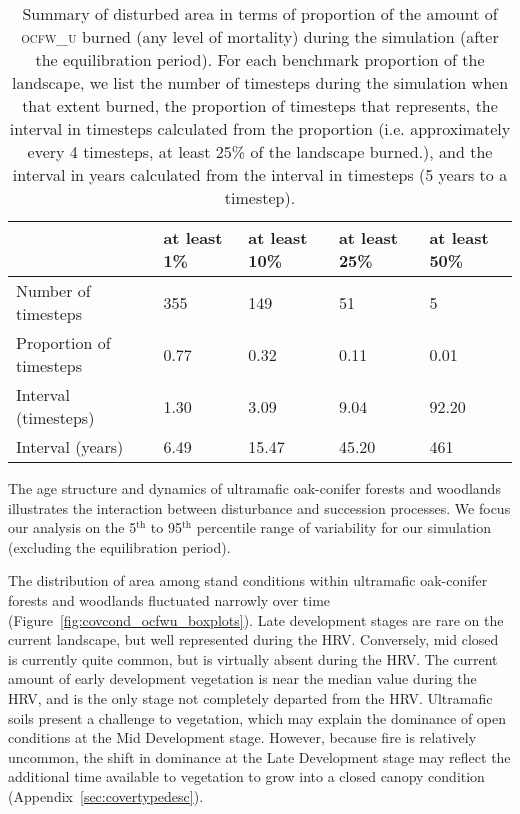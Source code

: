 \begin{table}[!htbp]
\small
\centering
\caption{Summary of disturbed area in terms of proportion of the amount of \textsc{ocfw\_u} burned (any level of mortality) during the simulation (after the equilibration period). For each benchmark proportion of the landscape, we list the number of timesteps during the simulation when that extent burned, the proportion of timesteps that represents, the interval in timesteps calculated from the proportion (i.e. approximately every 4 timesteps, at least 25\% of the landscape burned.), and the interval in years calculated from the interval in timesteps (5 years to a timestep).}
\label{tab:darea_atleast_ocfwu}
\begin{tabular}{@{}lllll@{}}
                        & at least 1\% & at least 10\% & at least 25\% & at least 50\% \\ \midrule
Number of timesteps     & 355          & 149           & 51            & 5         \\
Proportion of timesteps & 0.77         & 0.32          & 0.11          & 0.01      \\
Interval (timesteps)    & 1.30         & 3.09          & 9.04          & 92.20     \\
Interval (years)        & 6.49         & 15.47         & 45.20         & 461   \\ \bottomrule
\end{tabular}
\end{table}

The age structure and dynamics of ultramafic oak-conifer forests and woodlands illustrates the interaction between disturbance and succession processes. We focus our analysis on the 5$^{\text{th}}$ to 95$^{\text{th}}$ percentile range of variability for our simulation (excluding the equilibration period). %

The distribution of area among stand conditions within ultramafic oak-conifer forests and woodlands fluctuated narrowly over time (Figure~\ref{fig:covcond_ocfwu_boxplots}). Late development stages are rare on the current landscape, but well represented during the HRV. Conversely, mid closed is currently quite common, but is virtually absent during the HRV. The current amount of early development vegetation is near the median value during the HRV, and is the only stage not completely departed from the HRV. Ultramafic soils present a challenge to vegetation, which may explain the dominance of open conditions at the Mid Development stage. However, because fire is relatively uncommon, the shift in dominance at the Late Development stage may reflect the additional time available to vegetation to grow into a closed canopy condition (Appendix~\ref{sec:covertypedesc}). %


